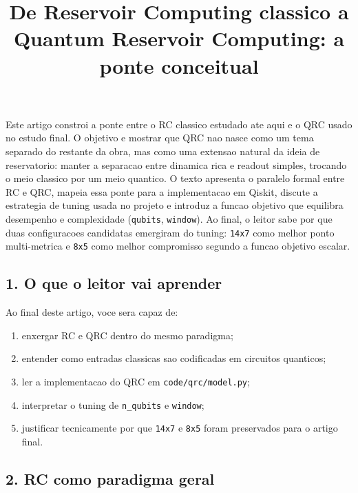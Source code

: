 \documentclass[12pt]{article}
\title{De Reservoir Computing classico a Quantum Reservoir Computing: a ponte conceitual}
\author{}
\providecommand{\tightlist}{%
          \setlength{\itemsep}{0pt}\setlength{\parskip}{0pt}}
\begin{document}
        \maketitle

        \begin{resumo}
        Este artigo constroi a ponte entre o RC classico estudado ate aqui e o QRC usado no estudo final. O objetivo e mostrar que QRC nao nasce como um tema separado do restante da obra, mas como uma extensao natural da ideia de reservatorio: manter a separacao entre dinamica rica e readout simples, trocando o meio classico por um meio quantico. O texto apresenta o paralelo formal entre RC e QRC, mapeia essa ponte para a implementacao em Qiskit, discute a estrategia de tuning usada no projeto e introduz a funcao objetivo que equilibra desempenho e complexidade (\texttt{qubits}, \texttt{window}). Ao final, o leitor sabe por que duas configuracoes candidatas emergiram do tuning: \texttt{14x7} como melhor ponto multi-metrica e \texttt{8x5} como melhor compromisso segundo a funcao objetivo escalar.
        \end{resumo}

        \subsection{1. O que o leitor vai aprender}\label{1-o-que-o-leitor-vai-aprender}

Ao final deste artigo, voce sera capaz de:

\begin{enumerate}
\def\labelenumi{\arabic{enumi}.}
\tightlist
\item
  enxergar RC e QRC dentro do mesmo paradigma;
\item
  entender como entradas classicas sao codificadas em circuitos quanticos;
\item
  ler a implementacao do QRC em \texttt{code/qrc/model.py};
\item
  interpretar o tuning de \texttt{n\_qubits} e \texttt{window};
\item
  justificar tecnicamente por que \texttt{14x7} e \texttt{8x5} foram preservados para o artigo final.
\end{enumerate}

\subsection{2. RC como paradigma geral}\label{2-rc-como-paradigma-geral}
\end{document}
